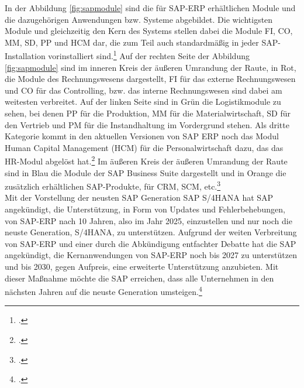 In der Abbildung \ref{fig:sapmodule} sind die für SAP-ERP erhältlichen Module und die dazugehörigen Anwendungen bzw. Systeme abgebildet. Die wichtigsten Module und gleichzeitig den Kern des Systems stellen dabei die Module FI, CO, MM, SD, PP und HCM dar, die zum Teil auch standardmäßig in jeder SAP-Installation vorinstalliert sind.\footcite[Vgl.][S. 8]{sap-für-wp} Auf der rechten Seite der Abbildung \ref{fig:sapmodule} sind im inneren Kreis der äußeren Umrandung der Raute, in Rot, die Module des Rechnungswesens dargestellt, FI für das externe Rechnungswesen und CO für das Controlling, bzw. das interne Rechnungswesen sind dabei am weitesten verbreitet. Auf der linken Seite sind in Grün die Logistikmodule zu sehen, bei denen PP für die Produktion, MM für die Materialwirtschaft, SD für den Vertrieb und PM für die Instandhaltung im Vordergrund stehen. Als dritte Kategorie kommt in den aktuellen Versionen von SAP ERP noch das Modul Human Capital Management (HCM) für die Personalwirtschaft dazu, das das HR-Modul abgelöst hat.\footcite[Vgl.][]{sap-module2} Im äußeren Kreis der äußeren Umrandung der Raute sind in Blau die Module der SAP Business Suite dargestellt und in Orange die zusätzlich erhältlichen SAP-Produkte, für CRM, SCM, etc.\footcite[Vgl.][]{sap-module}
\\Mit der Vorstellung der neusten SAP Generation \glqq{}SAP S/4HANA\grqq{} hat SAP angekündigt, die Unterstützung, in Form von Updates und Fehlerbehebungen, von SAP-ERP nach 10 Jahren, also im Jahr 2025, einzustellen und nur noch die neuste Generation, S/4HANA, zu unterstützen. Aufgrund der weiten Verbreitung von SAP-ERP und einer durch die Abkündigung entfachter Debatte hat die SAP angekündigt, die Kernanwendungen von SAP-ERP noch bis 2027 zu unterstützen und bis 2030, gegen Aufpreis, eine erweiterte Unterstützung anzubieten. Mit dieser Maßnahme möchte die SAP erreichen, dass alle Unternehmen in den nächsten Jahren auf die neuste Generation umsteigen.\footcite[Vgl.][]{sap-support}

